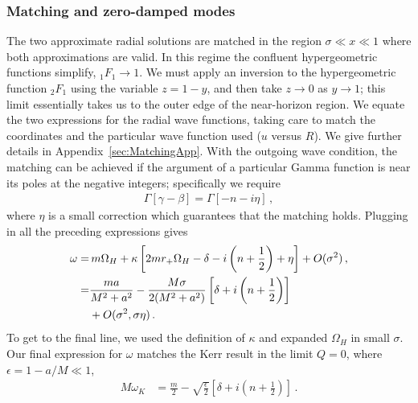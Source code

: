 \begin{refsection}
\subsubsection{Matching and zero-damped modes}
\label{sec:Matching}

The two approximate radial solutions are matched in the region $\sigma \ll x \ll 1$ where both approximations are valid. In this regime the confluent hypergeometric functions simplify, ${}_1 F_1 \to 1$. We must apply an inversion to the hypergeometric function ${}_2 F_1$ using the variable $z = 1-y$, and then take $z \to 0$ as $y\to 1$; this limit essentially takes us to the outer edge of the near-horizon region. 
We equate the two expressions for the radial wave functions, taking care to match the coordinates and the particular wave function used ($u$ versus $R$).
We give further details in Appendix~\ref{sec:MatchingApp}. 
With the outgoing wave condition, the matching can be achieved if the argument of a particular Gamma function is near its poles at the negative integers; specifically we require
\begin{align}
\Gamma[\gamma - \beta] = \Gamma[-n - i \eta] \,,
\end{align}
where $\eta$ is a small correction which guarantees that the matching holds. 
Plugging in all the preceding expressions gives 
\begin{align}
\label{eq:DFfreq}
\omega  = & \, m \Omega_H + \kappa \left[2 m r_+ \Omega_H - \delta - i \left( n + \frac 12\right) + \eta \right] + O(\sigma^2) \,, \notag \\
 =&  \frac{ma}{M^2+a^2} - \frac{M \sigma}{2(M^2+a^2)} \left[\delta +  i \left(n + \frac12\right) \right]  
 \notag \\ &
 + O(\sigma^2, \sigma \eta) \,.
\end{align}
To get to the final line, we used the definition of $\kappa$ and expanded $\Omega_H$ in small $\sigma$.
Our final expression for $\omega$ matches the Kerr result in the limit $Q =0$, where $\epsilon = 1- a/M \ll 1$,
\begin{align}
M \omega_K & = \frac{m}{2} - \sqrt{\frac{\epsilon}{2}} \left[ \delta + i \left(n + \frac 12\right) \right]\,.
\end{align}


\end{refsection}

